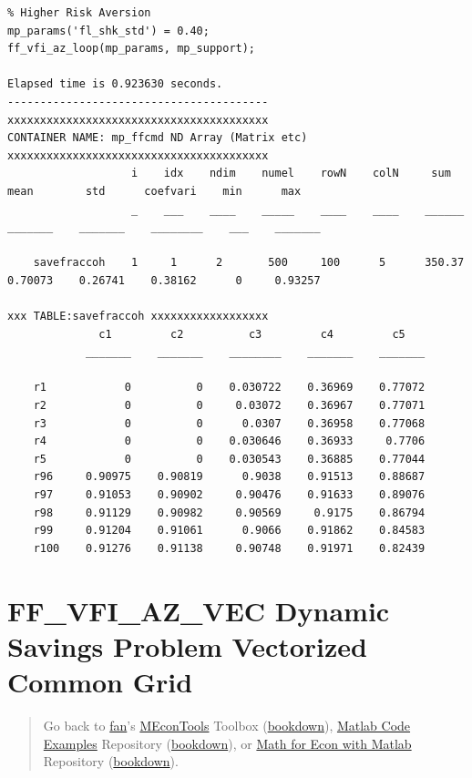 \documentclass[
]{book}
\begin{document}
\begin{verbatim}
% Higher Risk Aversion
mp_params('fl_shk_std') = 0.40;
ff_vfi_az_loop(mp_params, mp_support);

Elapsed time is 0.923630 seconds.
----------------------------------------
xxxxxxxxxxxxxxxxxxxxxxxxxxxxxxxxxxxxxxxx
CONTAINER NAME: mp_ffcmd ND Array (Matrix etc)
xxxxxxxxxxxxxxxxxxxxxxxxxxxxxxxxxxxxxxxx
                   i    idx    ndim    numel    rowN    colN     sum       mean        std      coefvari    min      max  
                   _    ___    ____    _____    ____    ____    ______    _______    _______    ________    ___    _______

    savefraccoh    1     1      2       500     100      5      350.37    0.70073    0.26741    0.38162      0     0.93257

xxx TABLE:savefraccoh xxxxxxxxxxxxxxxxxx
              c1         c2          c3         c4         c5   
            _______    _______    ________    _______    _______

    r1            0          0    0.030722    0.36969    0.77072
    r2            0          0     0.03072    0.36967    0.77071
    r3            0          0      0.0307    0.36958    0.77068
    r4            0          0    0.030646    0.36933     0.7706
    r5            0          0    0.030543    0.36885    0.77044
    r96     0.90975    0.90819      0.9038    0.91513    0.88687
    r97     0.91053    0.90902     0.90476    0.91633    0.89076
    r98     0.91129    0.90982     0.90569     0.9175    0.86794
    r99     0.91204    0.91061      0.9066    0.91862    0.84583
    r100    0.91276    0.91138     0.90748    0.91971    0.82439
\end{verbatim}

\hypertarget{ff_vfi_az_vec-dynamic-savings-problem-vectorized-common-grid}{%
\section{FF\_VFI\_AZ\_VEC Dynamic Savings Problem Vectorized Common Grid}\label{ff_vfi_az_vec-dynamic-savings-problem-vectorized-common-grid}}

\begin{quote}
Go back to \href{http://fanwangecon.github.io/}{fan}'s \href{https://fanwangecon.github.io/MEconTools/}{MEconTools} Toolbox (\href{https://fanwangecon.github.io/MEconTools/bookdown}{bookdown}), \href{https://fanwangecon.github.io/M4Econ/}{Matlab Code Examples} Repository (\href{https://fanwangecon.github.io/M4Econ/bookdown}{bookdown}), or \href{https://fanwangecon.github.io/Math4Econ/}{Math for Econ with Matlab} Repository (\href{https://fanwangecon.github.io/Math4Econ/bookdown}{bookdown}).
\end{quote}
\end{document}
